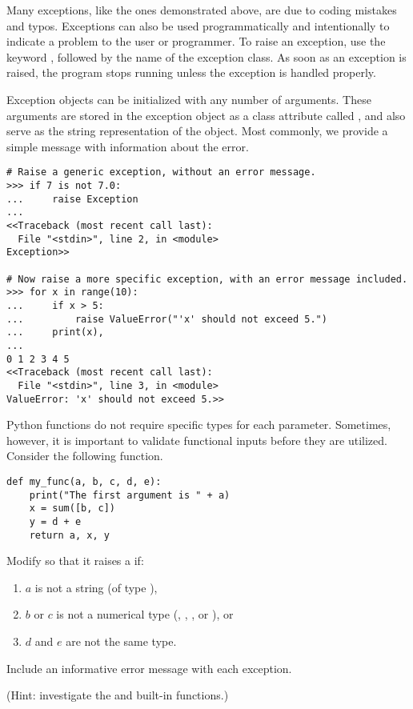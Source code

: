 Many exceptions, like the ones demonstrated above, are due to coding mistakes and typos.
Exceptions can also be used programmatically and intentionally to indicate a problem to the user or programmer.
To raise an exception, use the keyword , followed by the name of the exception class.
As soon as an exception is raised, the program stops running unless the exception is handled properly.

Exception objects can be initialized with any number of arguments.
These arguments are stored in the exception object as a class attribute called , and also serve as the string representation of the object.
Most commonly, we provide a simple message with information about the error.

\begin{lstlisting}
# Raise a generic exception, without an error message.
>>> if 7 is not 7.0:
...     raise Exception
... 
<<Traceback (most recent call last):
  File "<stdin>", line 2, in <module>
Exception>>

# Now raise a more specific exception, with an error message included.
>>> for x in range(10):
...     if x > 5:
...         raise ValueError("'x' should not exceed 5.")
...     print(x),
... 
0 1 2 3 4 5
<<Traceback (most recent call last):
  File "<stdin>", line 3, in <module>
ValueError: 'x' should not exceed 5.>>
\end{lstlisting}

\begin{problem}
Python functions do not require specific types for each parameter.
Sometimes, however, it is important to validate functional inputs before they are utilized.
Consider the following function.
\begin{lstlisting}
def my_func(a, b, c, d, e):
    print("The first argument is " + a)
    x = sum([b, c])
    y = d + e
    return a, x, y
\end{lstlisting}
Modify  so that it raises a  if:
\begin{enumerate}
\item $a$ is not a string (of type ),
\item $b$ or $c$ is not a numerical type (, , , or ), or
\item $d$ and $e$ are not the same type.
\end{enumerate}
Include an informative error message with each exception.

(Hint: investigate the  and  built-in functions.)
\end{problem}

